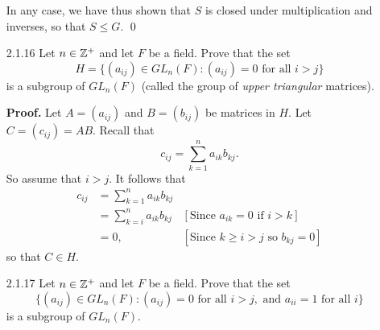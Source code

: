 \begin{enumerate}
      In any case, we have thus shown that $S$ is closed under multiplication
      and inverses, so that $S \le G$. \qed
   \item[2.1.16]  Let $n \in \mathbb{Z}^+$ and let $F$ be a field. Prove that the set
                  $$H = \{(a_{ij}) \in GL_n(F) : (a_{ij}) = 0 \text{ for all }
                     i > j\}$$
                  is a subgroup of $GL_n(F)$ (called the group of
                  \textit{upper triangular} matrices).

      \textbf{Proof.} Let $A = (a_{ij})$ and $B = (b_{ij})$ be matrices in $H$. 
      Let $C = (c_{ij}) = AB$. Recall that
      $$c_{ij} = \sum_{k=1}^na_{ik}b_{kj}.$$
      So assume that $i > j$. It follows that
      \begin{align*}
         c_{ij} &= \sum_{k=1}^na_{ik}b_{kj} \\
            &= \sum_{k=i}^na_{ik}b_{kj}
               &[\text{Since }a_{ik} = 0 \text{ if } i > k] \\
            &= 0, &[\text{Since }k \ge i > j \text{ so } b_{kj} = 0]
      \end{align*}
      so that $C \in H$.

   \item[2.1.17]  Let $n \in \mathbb{Z}^+$ and let $F$ be a field. Prove that the set
                  $$\{(a_{ij}) \in GL_n(F) : (a_{ij}) = 0 \text{ for all }
                      i > j, \text{ and } a_{ii} = 1 \text{ for all }i\}$$
                  is a subgroup of $GL_n(F)$.
\end{enumerate}
